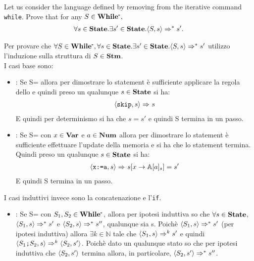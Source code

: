 \newcommand{\whilem}{\syntacticCategory{While\textsuperscript{-}}}
\newcommand{\exOne}{$\forall{}S\in\whilem,\forall{}s\in\states.\exists s'\in\states.\confSs{S}{s}\Rar{*}s'$}

{
	Let us consider the language \whilem{} defined by removing from \while{}
	the iterative command \texttt{while}.  Prove that for any 
	$S\in\whilem,$
	\begin{align*}
	\forall{}s\in\mbox{\textbf{State}}.\exists s'\in\mbox{\textbf{State}}.\langle{}S, s\rangle{}\Rightarrow^{*}s'.
	\end{align*}
}
{
	Per provare che \exOne{} utilizzo l'induzione sulla struttura di $S\in\mbox{\textbf{Stm}}$.
	\\I casi base sono:
	
	\begin{itemize}
	
	\item {}: Se S=\skipistr{} allora per dimostrare lo
	statement è sufficiente applicare la regola dello \skipSOS{} e quindi preso
	un qualunque $s\in\mbox{\textbf{State}}$ si ha:
	\begin{align*}
	\langle{}\textrm{\normalfont{\texttt{skip}}}, s\rangle{}\Rightarrow^{}s
	\end{align*}
	E quindi per determinismo si ha che $s=s'$ e quindi S termina in un passo.

	\item {}: Se S= con $x\in\mbox{\textbf{Var}}$
	e $a\in\mbox{\textbf{Num}}$ allora per dimostrare lo statement è sufficiente effettuare
	l'update della memoria e si ha che lo statement termina. Quindi preso un
	qualunque $s\in\mbox{\textbf{State}}$ si ha:
	\begin{align*}
	\langle{}\textrm{\normalfont{\texttt{x:=a}}}, s\rangle{}\Rightarrow^{}s[x\rightarrow{}\mathbb{A}[a]_s]=s'
	\end{align*}
	E quindi S termina in un passo.
	
	\end{itemize}
	

	I casi induttivi invece sono la concatenazione e l'\texttt{if}.
	\begin{itemize}

	\item {}: Se S=
	con $S_1,S_2\in\whilem$, allora per ipotesi induttiva so che 
	$\forall{}s\in\mbox{\textbf{State}}$, $\langle{}S_1, s\rangle{}\Rightarrow^{*}s'$ e 
	$\langle{}S_2, s\rangle{}\Rightarrow^{*}s''$, qualunque sia s. Poichè 
	$\langle{}S_1, s\rangle{}\Rightarrow^{*}s'$ (per ipotesi induttiva) allora 
	$\exists{}k\in\mathbb{N}$ tale che $\langle{}S_1, s\rangle{}\Rightarrow^{k}s'$ e quindi
	$\langle{}\textrm{\normalfont{\texttt{$S_1$;$S_2$}}}, s\rangle{}\Rightarrow^{k}\langle{}S_2, s'\rangle{}$. Poichè
	dato un qualunque stato so che per ipotesi induttiva che $\langle{}S_2, s'\rangle{}$
	termina allora, in particolare, $\langle{}S_2, s'\rangle{}\Rightarrow^{*}s''$.


\end{itemize}}
